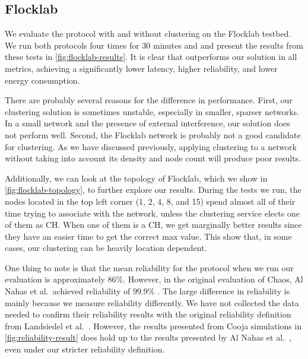 \subsection{Flocklab}
We evaluate the \atwo{} protocol with and without clustering on the Flocklab testbed. We run both protocols four times for 30 minutes and and present the results from these tests in \cref{fig:flocklab-results}. It is clear that \atwo{} outperforms our solution in all metrics, achieving a significantly lower latency, higher reliability, and lower energy consumption.

There are probably several reasons for the difference in performance. First, our clustering solution is sometimes unstable, especially in smaller, sparser networks. In a small network and the presence of external interference, our solution does not perform well. Second, the Flocklab network is probably not a good candidate for clustering. As we have discussed previously, applying clustering to a network without taking into account its density and node count will produce poor results.

Additionally, we can look at the topology of Flocklab, which we show in \cref{fig:flocklab-topology}, to further explore our results. During the tests we run, the nodes located in the top left corner (1, 2, 4, 8, and 15) spend almost all of their time trying to associate with the network, unless the clustering service elects one of them as CH. When one of them is a CH, we get marginally better results since they have an easier time to get the correct max value. This show that, in some cases, our clustering can be heavily location dependent.

One thing to note is that the mean reliability for the \atwo{} protocol when we run our evaluation is approximately $86\%$. However, in the original evaluation of Chaos, Al Nahas et al.~achieved reliability of $99.9\%$ \cite{chaos-introduction-paper}. The large difference in reliability is mainly because we measure reliability differently. We have not collected the data needed to confirm their reliability results with the original reliability definition from Landsiedel et al.~\cite{chaos-introduction-paper}. However, the results presented from Cooja simulations in \cref{fig:reliability-result} does hold up to the results presented by Al Nahas et al.~\cite{a2-introduction-paper}, even under our stricter reliability definition.

